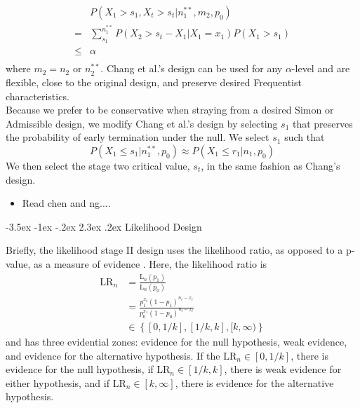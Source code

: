 \documentclass[12pt]{report}\usepackage[]{graphicx}\usepackage[]{color}
\makeatletter
\newlength{\li}\setlength{\li}{14.48pt}
\newlength{\di}\setlength{\di}{-3.5mm}
\renewcommand\subsection{\@startsection {subsection}{2}{\z@}%
                                   {-3.5ex \@plus -1ex \@minus -.2ex}%
                                   {2.3ex \@plus.2ex}%
                                   {\noindent \large \fontfamily{qcs}\selectfont }}
\makeatother
\begin{document}
\begin{equation*}
\begin{aligned}
& P(X_1 > s_1, X_t > s_t | n_1^{\ast\ast}, m_2, p_0) \\
= & \sum_{s_1}^{n_1^{\ast\ast}} P(X_2 > s_t - X_1 | X_1 = x_1) P(X_1 > s_1) \\
 \leq & \alpha \\
\end{aligned}
\end{equation*}
where $m_2 = n_2$ or $n_2^{\ast\ast}$. 
Chang et al.'s design can be used for any $\alpha$-level and are flexible, close to the original design, and preserve desired Frequentist characteristics. \\
Because we prefer to be conservative when straying from a desired Simon or Admissible design, we modify Chang et al.'s design by selecting $s_1$ that preserves the probability of early termination under the null. We select $s_1$ such that $$P(X_1 \leq s_1 | n_1^{\ast\ast}, p_0) \approx P(X_1 \leq r_1 | n_1, p_0)$$ We then select the stage two critical value, $s_t$, in the same fashion as Chang's design.  

\begin{itemize}
\item Read chen and ng....
\end{itemize}
\subsection{Likelihood Design}

Briefly, the likelihood stage II design uses the likelihood ratio, as opposed to a p-value, as a measure of evidence \cite{Blume}. Here, the likelihood ratio is 
\begin{equation*}
\begin{aligned}
\mbox{LR}_n & = \frac{\mbox{L}_n(p_1)}{\mbox{L}_n(p_0)} \\
&= \frac{p_1^{x_t}(1-p_1)^{n_t-x_t}}{p_0^{x_1}(1-p_0)^{n_t-x_t}} \\
& \in \left\{[0, 1/k], [1/k,k], [k, \infty)\right\}
\end{aligned}
\end{equation*}
and has three evidential zones: evidence for the null hypothesis, weak evidence, and evidence for the alternative hypothesis. If the $\mbox{LR}_n \in [0, 1/k]$, there is evidence for the null hypothesis, if $\mbox{LR}_n \in [1/k,k]$, there is weak evidence for either hypothesis, and if $\mbox{LR}_n \in [k,\infty]$, there is evidence for the alternative hypothesis. \\
\end{document}
